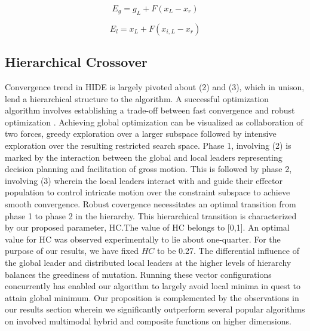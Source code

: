 \begin{equation}
\label{one}
E_g = g_L + F (x_L - x_r)
\end{equation}

\begin{equation}
\label{two}
E_l = x_L + F (x_{i,L} - x_r)
\end{equation}

\subsection{Hierarchical Crossover}

Convergence trend in HIDE is largely pivoted about (2) and (3), which in unison, lend a hierarchical structure to the algorithm. A successful optimization algorithm involves establishing a trade-off between fast convergence and robust optimization \cite{storn1995differential}. Achieving global optimization can be visualized as collaboration of two forces, greedy exploration over a larger subspace followed by intensive exploration over the resulting restricted search space. Phase 1, involving (2) is marked by the interaction between the global and local leaders representing decision planning and facilitation of gross motion. This is followed by phase 2, involving (3) wherein the local leaders interact with and guide their effector population to control intricate motion over the constraint subspace to achieve smooth convergence. Robust covergence necessitates an optimal transition from phase 1 to phase 2 in the hierarchy. This hierarchical transition is characterized by our proposed parameter, HC.The value of HC belongs to [0,1]. An optimal value for HC was observed experimentally to lie about one-quarter. For the purpose of our results, we have fixed $HC$ to be 0.27.
The differential influence of the global leader and distributed local leaders at the higher levels of hierarchy balances the greediness of mutation. Running these vector configurations concurrently has enabled our algorithm to largely avoid local minima in quest to attain global minimum. Our proposition is complemented by the observations in our results section wherein we significantly outperform several popular algorithms on involved multimodal hybrid and composite functions on higher dimensions.


